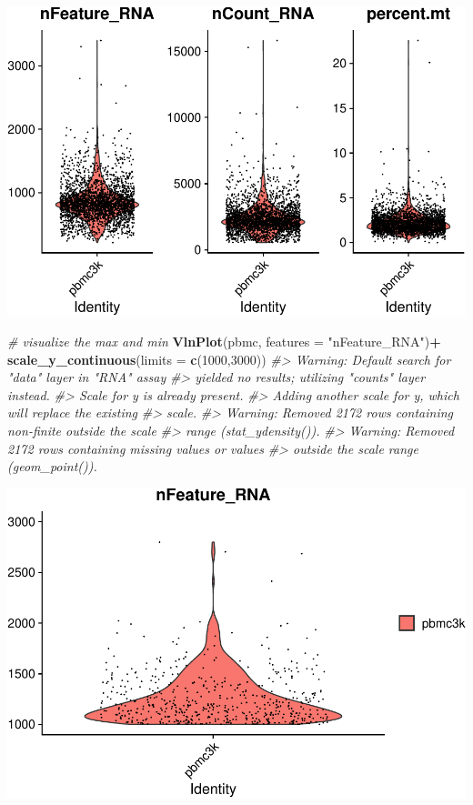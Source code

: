 \documentclass[
]{book}
\newenvironment{Shaded}{\begin{snugshade}}{\end{snugshade}}
\newcommand{\AttributeTok}[1]{\textcolor[rgb]{0.13,0.29,0.53}{#1}}
\newcommand{\CommentTok}[1]{\textcolor[rgb]{0.56,0.35,0.01}{\textit{#1}}}
\newcommand{\DecValTok}[1]{\textcolor[rgb]{0.00,0.00,0.81}{#1}}
\newcommand{\FunctionTok}[1]{\textcolor[rgb]{0.13,0.29,0.53}{\textbf{#1}}}
\newcommand{\NormalTok}[1]{#1}
\newcommand{\SpecialCharTok}[1]{\textcolor[rgb]{0.81,0.36,0.00}{\textbf{#1}}}
\newcommand{\StringTok}[1]{\textcolor[rgb]{0.31,0.60,0.02}{#1}}
\begin{document}
\includegraphics{scRNAseqInR_Doco_files/figure-latex/qc2-1.pdf}

\begin{Shaded}
\begin{Highlighting}[]


\CommentTok{\# visualize the max and min }
\FunctionTok{VlnPlot}\NormalTok{(pbmc, }\AttributeTok{features =} \StringTok{"nFeature\_RNA"}\NormalTok{)}\SpecialCharTok{+} \FunctionTok{scale\_y\_continuous}\NormalTok{(}\AttributeTok{limits =} \FunctionTok{c}\NormalTok{(}\DecValTok{1000}\NormalTok{,}\DecValTok{3000}\NormalTok{))}
\CommentTok{\#\textgreater{} Warning: Default search for "data" layer in "RNA" assay}
\CommentTok{\#\textgreater{} yielded no results; utilizing "counts" layer instead.}
\CommentTok{\#\textgreater{} Scale for y is already present.}
\CommentTok{\#\textgreater{} Adding another scale for y, which will replace the existing}
\CommentTok{\#\textgreater{} scale.}
\CommentTok{\#\textgreater{} Warning: Removed 2172 rows containing non{-}finite outside the scale}
\CommentTok{\#\textgreater{} range (\textasciigrave{}stat\_ydensity()\textasciigrave{}).}
\CommentTok{\#\textgreater{} Warning: Removed 2172 rows containing missing values or values}
\CommentTok{\#\textgreater{} outside the scale range (\textasciigrave{}geom\_point()\textasciigrave{}).}
\end{Highlighting}
\end{Shaded}

\includegraphics{scRNAseqInR_Doco_files/figure-latex/qc2-2.pdf}
\end{document}

